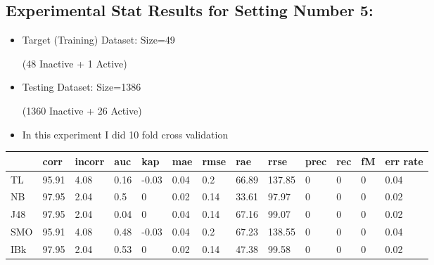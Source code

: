 \documentclass[a4paper,12pt, english]{article}
\begin{document}
\subsection{Experimental Stat Results for Setting Number 5:}
\begin{itemize}
\item Target (Training) Dataset: Size=49 \begin{scriptsize}(48 Inactive + 1 Active)\end{scriptsize}
\item Testing Dataset: Size=1386 \begin{scriptsize}(1360 Inactive + 26 Active)\end{scriptsize}
\item In this experiment I did 10 fold cross validation
\end{itemize}  

\begin{small}
\begin{center}
    \begin{tabular}{ | l | l | l | l | l | l | l | l | l | l | l | l | l |}
    \hline
      	& corr & incorr  & auc & kap & mae & rmse & rae & rrse & prec & rec & fM & err rate\\ \hline
      	TL & 95.91 & 4.08 & 0.16 & -0.03 & 0.04 & 0.2 & 66.89 & 137.85 & 0 & 0 & 0 & 0.04\\ \hline
	NB & 97.95 & 2.04 & 0.5 & 0 & 0.02 & 0.14 & 33.61 & 97.97 & 0 & 0 & 0 & 0.02\\ \hline
	J48 & 97.95 & 2.04 & 0.04 & 0 & 0.04 & 0.14 & 67.16 & 99.07 & 0 & 0 & 0 & 0.02\\ \hline
	SMO & 95.91 & 4.08 & 0.48 & -0.03 & 0.04 & 0.2 & 67.23 & 138.55 & 0 & 0 & 0 & 0.04\\ \hline
	IBk & 97.95 & 2.04 & 0.53 & 0 & 0.02 & 0.14 & 47.38 & 99.58 & 0 & 0 & 0 & 0.02\\ \hline  
    \end{tabular}       
\end{center}
\end{small}
\end{document}
